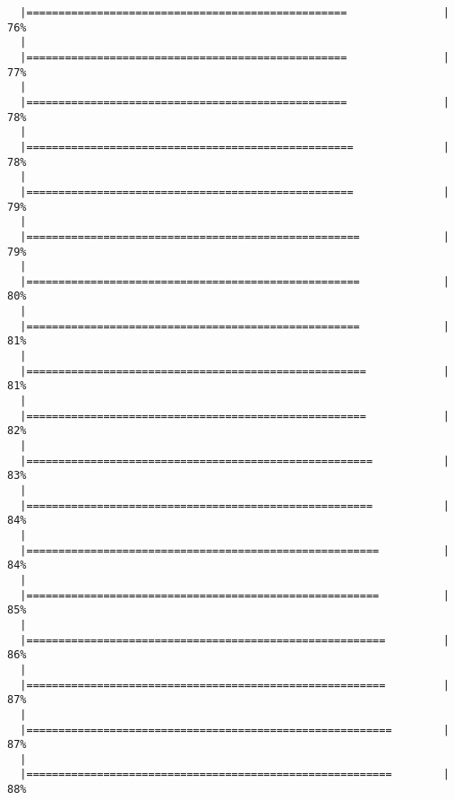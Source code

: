 \documentclass[a4paper]{article}
\begin{document}
\begin{verbatim}
  |==================================================               |  76%
  |                                                                       
  |==================================================               |  77%
  |                                                                       
  |==================================================               |  78%
  |                                                                       
  |===================================================              |  78%
  |                                                                       
  |===================================================              |  79%
  |                                                                       
  |====================================================             |  79%
  |                                                                       
  |====================================================             |  80%
  |                                                                       
  |====================================================             |  81%
  |                                                                       
  |=====================================================            |  81%
  |                                                                       
  |=====================================================            |  82%
  |                                                                       
  |======================================================           |  83%
  |                                                                       
  |======================================================           |  84%
  |                                                                       
  |=======================================================          |  84%
  |                                                                       
  |=======================================================          |  85%
  |                                                                       
  |========================================================         |  86%
  |                                                                       
  |========================================================         |  87%
  |                                                                       
  |=========================================================        |  87%
  |                                                                       
  |=========================================================        |  88%

\end{verbatim}
\end{document}
